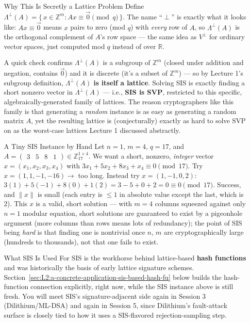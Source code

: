 \begin{rmkbox}{Why This Is Secretly a Lattice Problem}
Define $\Lambda^{\perp}(A) = \{\, x \in \mathbb{Z}^m : Ax \equiv \vec 0 \pmod q \,\}$. The name ``$\perp$'' is exactly what it looks like: $Ax\equiv \vec 0$ means $x$ pairs to zero (mod $q$) with \emph{every} row of $A$, so $\Lambda^\perp(A)$ is the orthogonal complement of $A$'s row space --- the same idea as $V^\perp$ for ordinary vector spaces, just computed mod $q$ instead of over $\mathbb{R}$.

A quick check confirms $\Lambda^\perp(A)$ is a subgroup of $\mathbb{Z}^m$ (closed under addition and negation, contains $\vec 0$) and it is discrete (it's a subset of $\mathbb{Z}^m$) --- so by Lecture 1's subgroup definition, $\Lambda^\perp(A)$ \textbf{is itself a lattice}. Solving SIS is exactly finding a short nonzero vector in $\Lambda^\perp(A)$ --- i.e., \textbf{SIS is SVP}, restricted to this specific, algebraically-generated family of lattices. The reason cryptographers like this family is that generating a \emph{random} instance is as easy as generating a random matrix $A$, yet the resulting lattice is (conjecturally) exactly as hard to solve SVP on as the worst-case lattices Lecture 1 discussed abstractly.
\end{rmkbox}

\begin{exbox}{A Tiny SIS Instance by Hand}
Let $n=1$, $m=4$, $q=17$, and $A = \begin{pmatrix}3 & 5 & 8 & 1\end{pmatrix} \in \mathbb{Z}_{17}^{1\times 4}$. We want a short, nonzero, \emph{integer} vector $x = (x_1,x_2,x_3,x_4)$ with $3x_1 + 5x_2 + 8x_3 + x_4 \equiv 0 \pmod{17}$. Try $x = (1,1,-1,-16) \to$ too long. Instead try $x = (1,-1,0,2)$: $3(1) + 5(-1) + 8(0) + 1(2) = 3 - 5 + 0 + 2 = 0 \equiv 0 \pmod{17}$. Success, and $\|x\|$ is small (each entry is $\le 1$ in absolute value except the last, which is $2$). This $x$ is a valid, short solution --- with $m=4$ columns squeezed against only $n=1$ modular equation, short solutions are guaranteed to exist by a pigeonhole argument (more columns than rows means lots of redundancy); the point of SIS being \emph{hard} is that finding one is nontrivial once $n$, $m$ are cryptographically large (hundreds to thousands), not that one fails to exist.
\end{exbox}

\begin{rmkbox}{What SIS Is Used For}
SIS is the workhorse behind lattice-based \textbf{hash functions} and was historically the basis of early lattice signature schemes. Section~\ref{sec:L2:a-concrete-application-sis-based-hash-fu} below builds the hash-function connection explicitly, right now, while the SIS instance above is still fresh. You will meet SIS's signature-adjacent side again in Session 3 (Dilithium/ML-DSA) and again in Session 5, since Dilithium's fault-attack surface is closely tied to how it uses a SIS-flavored rejection-sampling step.
\end{rmkbox}

